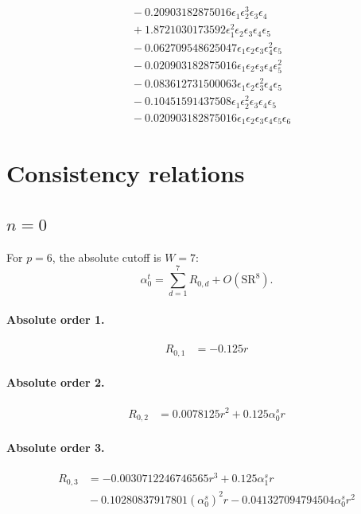 \documentclass[10pt]{article}
\begin{document}
\begin{align*}
&{}  - 0.20903182875016 \epsilon_{1} \epsilon_{2}^{3} \epsilon_{3} \epsilon_{4} \\
&{}  + 1.8721030173592 \epsilon_{1}^{2} \epsilon_{2} \epsilon_{3} \epsilon_{4} \epsilon_{5} \\
&{}  - 0.062709548625047 \epsilon_{1} \epsilon_{2} \epsilon_{3} \epsilon_{4}^{2} \epsilon_{5} \\
&{}  - 0.020903182875016 \epsilon_{1} \epsilon_{2} \epsilon_{3} \epsilon_{4} \epsilon_{5}^{2} \\
&{}  - 0.083612731500063 \epsilon_{1} \epsilon_{2} \epsilon_{3}^{2} \epsilon_{4} \epsilon_{5} \\
&{}  - 0.10451591437508 \epsilon_{1} \epsilon_{2}^{2} \epsilon_{3} \epsilon_{4} \epsilon_{5} \\
&{}  - 0.020903182875016 \epsilon_{1} \epsilon_{2} \epsilon_{3} \epsilon_{4} \epsilon_{5} \epsilon_{6}
\end{align*}

\section{Consistency relations}
\subsection{$n=0$}
For $p=6$, the absolute cutoff is $W=7$:
\[\alpha_{0}^t=\sum_{d=1}^{7}R_{0,d}+O(\mathrm{SR}^{8}).\]
\paragraph{Absolute order 1.}
\begin{align*}
R_{0,1} &=  - 0.125 r
\end{align*}

\paragraph{Absolute order 2.}
\begin{align*}
R_{0,2} &= 0.0078125 r^{2} + 0.125 \alpha_{0}^s r
\end{align*}

\paragraph{Absolute order 3.}
\begin{align*}
R_{0,3} &=  - 0.0030712246746565 r^{3} + 0.125 \alpha_{1}^s r \\
&{}  - 0.10280837917801 \left(\alpha_{0}^s\right)^{2} r - 0.041327094794504 \alpha_{0}^s r^{2}
\end{align*}
\end{document}
